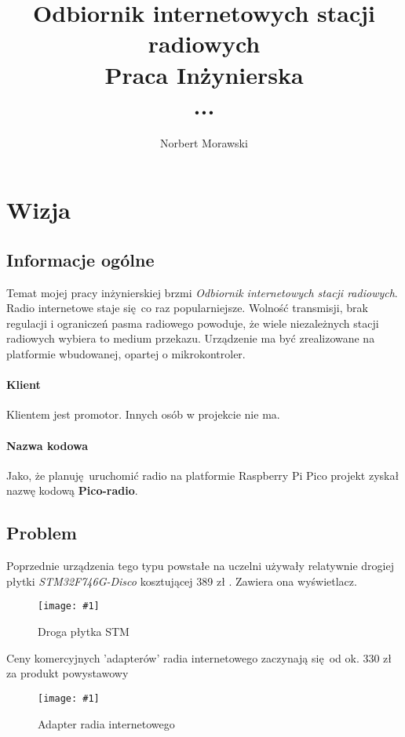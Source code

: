 \documentclass[12pt]{article}
\newcommand{\imgcustomsize}[3]{
	\begin{figure}[H]
		\centering
		\texttt{[image: \#1]}
		\caption{#2}
	\end{figure}
}
\newcommand{\img}[2]{\imgcustomsize{#1}{#2}{0.7}}
\begin{document}
	
	\title{Odbiornik internetowych stacji radiowych \\
		\vspace{0.2cm}
		\large Praca Inżynierska \\
		\large ...}
	\author{Norbert Morawski}
	
	\maketitle
	\tableofcontents
	\pagebreak
	
	\section{Wizja}
	
	\subsection{Informacje ogólne}
		Temat mojej pracy inżynierskiej brzmi \textit{Odbiornik internetowych stacji radiowych}. Radio internetowe staje się co raz popularniejsze. Wolność transmisji, brak regulacji i ograniczeń pasma radiowego powoduje, że wiele niezależnych stacji radiowych wybiera to medium przekazu. Urządzenie ma być zrealizowane na platformie wbudowanej, opartej o mikrokontroler.
		
		\paragraph{Klient}
		Klientem jest promotor. Innych osób w projekcie nie ma.
		
		\paragraph{Nazwa kodowa}
		Jako, że planuję uruchomić radio na platformie Raspberry Pi Pico projekt zyskał nazwę kodową \textbf{Pico-radio}.
		
	\subsection{Problem}
		Poprzednie urządzenia tego typu powstałe na uczelni używały relatywnie drogiej płytki \textit{STM32F746G-Disco} kosztującej 389 zł \textsuperscript{\cite{botland_stm}}. Zawiera ona wyświetlacz.
		\img{botland_stm}{Droga płytka STM}
		
		Ceny komercyjnych 'adapterów' radia internetowego zaczynają się od ok. 330 zł za produkt powystawowy \textsuperscript{\cite{allegro_adapter}}
		\img{allegro_adapter}{Adapter radia internetowego}
		
\end{document}
